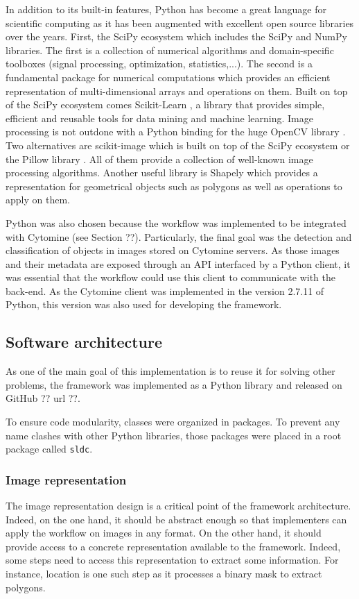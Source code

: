 In addition to its built-in features, Python has become a great language for scientific computing as it has been augmented with excellent open source libraries over the years. First, the SciPy ecosystem which includes the SciPy \cite{oliphant:2007} and NumPy \cite{vanderwalt:2011} libraries. The first is a collection of numerical algorithms and domain-specific toolboxes (signal processing, optimization, statistics,...). The second is a fundamental package for numerical computations which provides an efficient representation of multi-dimensional arrays and operations on them. Built on top of the SciPy ecosystem comes Scikit-Learn \cite{pedregosa:2011}, a library that provides simple, efficient and reusable tools for data mining and machine learning. Image processing is not outdone with a Python binding for the huge OpenCV library \cite{opencv_library}. Two alternatives are scikit-image \cite{scikit-image} which is built on top of the SciPy ecosystem or the Pillow library \cite{pillow}. All of them provide a collection of well-known image processing algorithms. Another useful library is Shapely \cite{shapely} which provides a representation for geometrical objects such as polygons as well as operations to apply on them. 

Python was also chosen because the workflow was implemented to be integrated with Cytomine (see Section ??). Particularly, the final goal was the detection and classification of objects in images stored on Cytomine servers. As those images and their metadata are exposed through an API interfaced by a Python client, it was essential that the workflow could use this client to communicate with the back-end. As the Cytomine client was implemented in the version 2.7.11 of Python, this version was also used for developing the framework. 

\subsection{Software architecture}
\label{ssec:work_arch}
As one of the main goal of this implementation is to reuse it for solving other problems, the framework was implemented as a Python library and released on GitHub ?? url ??.

To ensure code modularity, classes were organized in packages. To prevent any name clashes with other Python libraries, those packages were placed in a root package called \texttt{sldc}. 

\subsubsection{Image representation} 
\label{sssec:work_image_repr}
The image representation design is a critical point of the framework architecture. Indeed, on the one hand, it should be abstract enough so that implementers can apply the workflow on images in any format. On the other hand, it should provide access to a concrete representation available to the framework. Indeed, some steps need to access this representation to extract some information. For instance, location is one such step as it processes a binary mask to extract polygons. 

